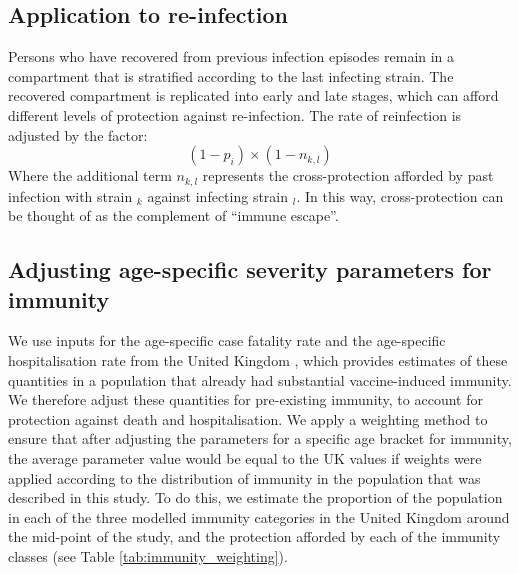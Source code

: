 \subsection{Application to re-infection}
Persons who have recovered from previous infection episodes 
remain in a compartment that is stratified
according to the last infecting strain.
The recovered compartment is replicated into early and late stages,
which can afford different levels of protection against re-infection.
The rate of reinfection is adjusted by the factor:
\[(1 - p_{i})\times (1 - n_{k,l})\]
Where the additional term \(n_{k,l}\) represents the cross-protection
afforded by past infection with strain \(_{k}\)
against infecting strain \(_{l}\).
In this way, cross-protection can be thought of as the complement
of ``immune escape''.

\subsection{Adjusting age-specific severity parameters for immunity}
We use inputs for the age-specific case fatality rate and the age-specific hospitalisation rate from the United Kingdom \cite{nyberg-2022}, 
which provides estimates of these quantities in a population that already had substantial vaccine-induced immunity.
We therefore adjust these quantities for pre-existing immunity, to account for protection against death and hospitalisation.
We apply a weighting method to ensure that after adjusting the parameters for a specific age bracket for immunity,
the average parameter value would be equal to the UK values if weights were applied according to the
distribution of immunity in the population that was described in this study.
To do this, we estimate the proportion of the population 
in each of the three modelled immunity categories
in the United Kingdom around the mid-point of the study,
and the protection afforded by each of the immunity classes 
(see Table \ref{tab:immunity_weighting}).


